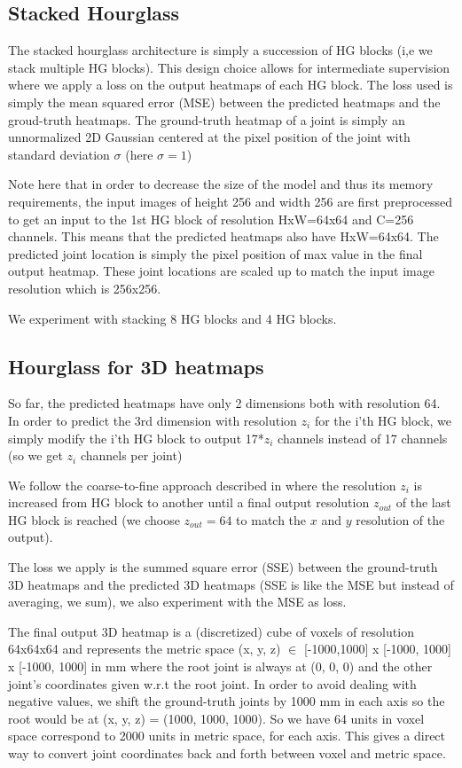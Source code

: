 \documentclass[sigconf]{acmart}
\begin{document}
\subsection{Stacked Hourglass}
\quad The stacked hourglass architecture is simply a succession of HG blocks (i,e we stack multiple HG blocks). This design choice allows for intermediate supervision where we apply a loss on the output heatmaps of each HG block. The loss used is simply the mean squared error (MSE) between the predicted heatmaps and the groud-truth heatmaps. The ground-truth heatmap of a joint is simply an unnormalized 2D Gaussian centered at the pixel position of the joint with standard deviation $\sigma$ (here $\sigma=1$)

Note here that in order to decrease the size of the model and thus its memory requirements, the input images of height 256 and width 256 are first preprocessed to get an input to the 1st HG block of resolution HxW=64x64 and C=256 channels. This means that the predicted heatmaps also have HxW=64x64. The predicted joint location is simply the pixel position of max value in the final output heatmap. These joint locations are scaled up to match the input image resolution which is 256x256.

We experiment with stacking 8 HG blocks and 4 HG blocks.
\subsection{Hourglass for 3D heatmaps}
\quad So far, the predicted heatmaps have only 2 dimensions both with resolution 64. In order to predict the 3rd dimension with resolution $z_i$ for the i'th HG block, we simply modify the i'th HG block to output 17*$z_i$ channels instead of 17 channels (so we get $z_i$ channels per joint)

We follow the coarse-to-fine approach described in \cite{pavlakos} where the resolution $z_i$ is increased from HG block to another until a final output resolution $z_{out}$ of the last HG block is reached (we choose $z_{out}=64$ to match the $x$ and $y$ resolution of the output).

The loss we apply is the summed square error (SSE) between the ground-truth 3D heatmaps and the predicted 3D heatmaps (SSE is like the MSE but instead of averaging, we sum), we also experiment with the MSE as loss.

The final output 3D heatmap is a (discretized) cube of voxels of resolution 64x64x64 and represents the metric space (x, y, z) $\in$ [-1000,1000] x [-1000, 1000] x [-1000, 1000] in mm where the root joint is always at (0, 0, 0) and the other joint's coordinates given w.r.t the root joint. In order to avoid dealing with negative values, we shift the ground-truth joints by 1000 mm in each axis so the root would be at (x, y, z) = (1000, 1000, 1000). So we have 64 units in voxel space correspond to 2000 units in metric space, for each axis. This gives a direct way to convert joint coordinates back and forth between voxel and metric space.
\end{document}
